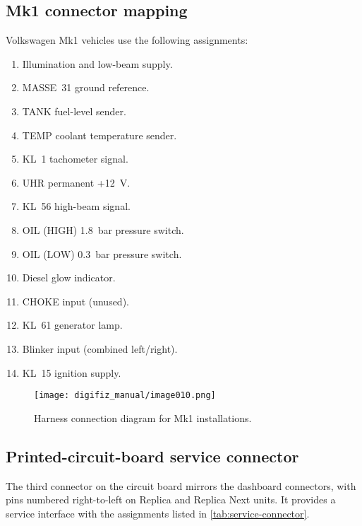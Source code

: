 \subsection{Mk1 connector mapping}
Volkswagen Mk1 vehicles use the following assignments:
\begin{enumerate}
    \item Illumination and low-beam supply.
    \item MASSE~31 ground reference.
    \item TANK fuel-level sender.
    \item TEMP coolant temperature sender.
    \item KL~1 tachometer signal.
    \item UHR permanent +12~V.
    \item KL~56 high-beam signal.
    \item OIL (HIGH) 1.8~bar pressure switch.
    \item OIL (LOW) 0.3~bar pressure switch.
    \item Diesel glow indicator.
    \item CHOKE input (unused).
    \item KL~61 generator lamp.
    \item Blinker input (combined left/right).
    \item KL~15 ignition supply.
\end{enumerate}
\begin{figure}[htbp]
    \centering
    \texttt{[image: digifiz\_manual/image010.png]}
    \caption{Harness connection diagram for Mk1 installations.}
\end{figure}

\subsection{Printed-circuit-board service connector}
The third connector on the circuit board mirrors the dashboard connectors, with pins numbered right-to-left on Replica and Replica Next units. It provides a service interface with the assignments listed in \autoref{tab:service-connector}.

